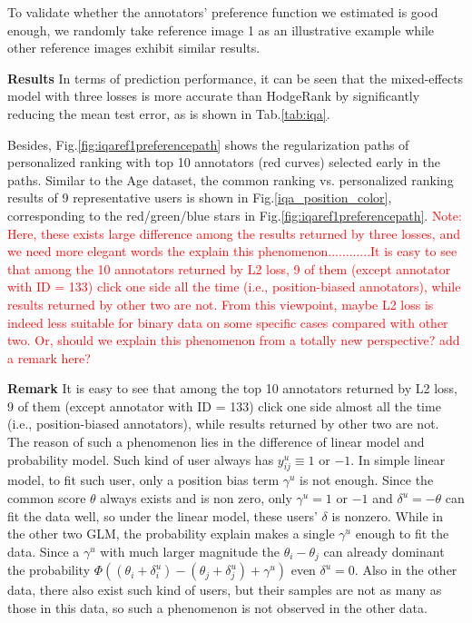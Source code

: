 \documentclass[10pt,journal,cspaper,compsoc]{IEEEtran}
\begin{document}
{To validate whether the annotators' preference function we estimated is good enough, we randomly take
reference image 1 as an illustrative example while other reference
images exhibit similar results.

\textbf{Results} In terms of prediction performance, it can be seen that the mixed-effects model with three losses is more accurate than HodgeRank by significantly reducing the mean test error, as is shown in Tab.\ref{tab:iqa}.

Besides, Fig.\ref{fig:iqaref1preferencepath} shows the regularization paths of personalized ranking with top 10 annotators (red curves) selected early in the paths.
Similar to the Age dataset, the common ranking vs. personalized ranking results of 9 representative users is shown in Fig.\ref{iqa_position_color}, corresponding to the red/green/blue stars in Fig.\ref{fig:iqaref1preferencepath}. \textcolor{red}{Note: Here, these exists large difference among the results returned by three losses, and we need more elegant words the explain this phenomenon............It is easy to see
that among the 10 annotators returned by L2 loss, 9 of them (except annotator
with ID = 133) click one side all the time (i.e., position-biased
annotators), while results returned by other two are not. From this viewpoint, maybe L2 loss is indeed less suitable for binary data on some specific cases compared with other two. Or, should we explain this phenomenon from a totally new perspective? add a remark here? }

\textcolor[rgb]{1.00,0.00,0.00}{\textbf{Remark} It is easy to see
that among the top 10 annotators returned by L2 loss, 9 of them (except annotator
with ID = 133) click one side almost all the time (i.e., position-biased
annotators), while results returned by other two are not. The reason of such a phenomenon lies in the difference of linear model and probability model. Such kind of user always has $y^u_{ij}\equiv 1$ or $-1$. In simple linear model, to fit such user, only a position bias term $\gamma^u$ is not enough. Since the common score $\theta$ always exists and is non zero, only $\gamma^u = 1$ or $-1$ and $\delta^u = -\theta$ can fit the data well, so under the linear model, these users' $\delta$ is nonzero. While in the other two GLM, the probability explain makes a single $\gamma^u$ enough to fit the data. Since a $\gamma^u$ with much larger magnitude the $\theta_i-\theta_j$ can already dominant the probability $\Phi((\theta_i+\delta_i^u) - (\theta_j+\delta_j^u) + \gamma^u)$ even $\delta^u = 0$. Also in the other data, there also exist such kind of users, but their samples are not as many as those in this data, so such a phenomenon is not observed in the other data.}

}
\end{document}
